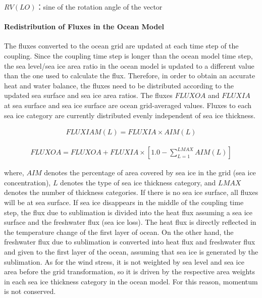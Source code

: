 \(RV(LO)\)：sine of the rotation angle of the vector

\hypertarget{redistribution-of-fluxes-in-the-ocean-model}{%
\paragraph{Redistribution of Fluxes in the Ocean Model}\label{redistribution-of-fluxes-in-the-ocean-model}}

The fluxes converted to the ocean grid are updated at each time step of the coupling. Since the coupling time step is longer than the ocean model time step, the sea level/sea ice area ratio in the
ocean model is updated to a different value than the one used to calculate the flux. Therefore, in order to obtain an accurate heat and water balance, the fluxes need to be distributed according to
the updated sea surface and sea ice area ratios. The fluxes \(FLUXOA\) and \(FLUXIA\) at sea surface and sea ice surface are ocean grid-averaged values. Fluxes to each sea ice category are currently
distributed evenly independent of sea ice thickness.

\begin{eqnarray} FLUXIAM(L)=FLUXIA \times AIM(L)\end{eqnarray}

\begin{eqnarray} FLUXOA=FLUXOA+FLUXIA \times [1.0-\sum_{L=1}^{LMAX}AIM(L)]\end{eqnarray}

where, \(AIM\) denotes the percentage of area covered by sea ice in the grid (sea ice concentration), \(L\) denotes the type of sea ice thickness category, and \(LMAX\) denotes the number of thickness
categories. If there is no sea ice surface, all fluxes will be at sea surface. If sea ice disappears in the middle of the coupling time step, the flux due to sublimation is divided into the heat flux
assuming a sea ice surface and the freshwater flux (sea ice loss). The heat flux is directly reflected in the temperature change of the first layer of ocean. On the other hand, the freshwater flux due
to sublimation is converted into heat flux and freshwater flux and given to the first layer of the ocean, assuming that sea ice is generated by the sublimation. As for the wind stress, it is not
weighted by sea level and sea ice area before the grid transformation, so it is driven by the respective area weights in each sea ice thickness category in the ocean model. For this reason, momentum
is not conserved.

